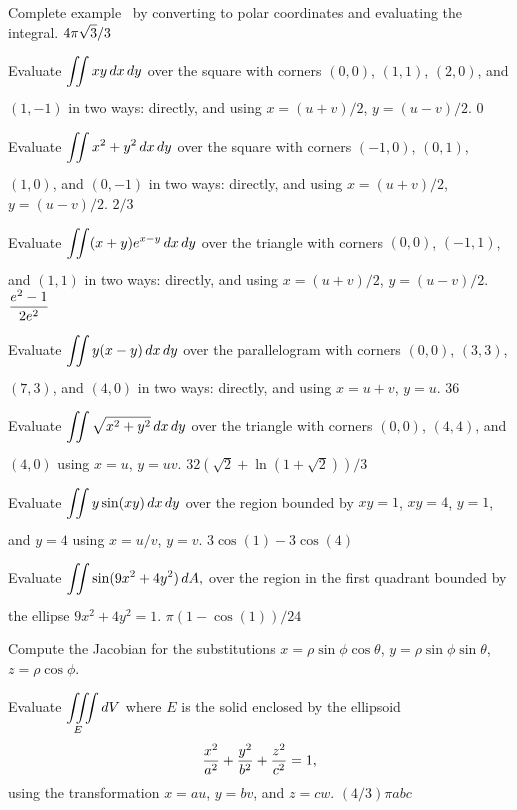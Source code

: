 \exercises

\exercise Complete example~ by
converting to polar coordinates and evaluating the integral.
\answer $\displaystyle 4\pi\sqrt3/3$
\endanswer
\endexercise

\exercise Evaluate $\ds\dint{} xy\,dx\,dy$ over the square
with corners $(0,0)$, $(1,1)$, $(2,0)$, and $(1,-1)$ in two ways:
directly, and using $x=(u+v)/2$, $y=(u-v)/2$.
\answer $0$
\endanswer
\endexercise

\exercise Evaluate $\ds\dint{} x^2+y^2\,dx\,dy$ over the square
with corners $(-1,0)$, $(0,1)$, $(1,0)$, and $(0,-1)$ in two ways:
directly, and using $x=(u+v)/2$, $y=(u-v)/2$.
\answer $2/3$
\endanswer
\endexercise

\exercise Evaluate $\ds\dint{} (x+y)e^{x-y}\,dx\,dy$ over the triangle
with corners $(0,0)$, $(-1,1)$, and $(1,1)$ in two ways:
directly, and using $x=(u+v)/2$, $y=(u-v)/2$.
\answer $\displaystyle {e^2-1\over 2e^2}$
\endanswer
\endexercise

\exercise Evaluate $\ds\dint{} y(x-y)\,dx\,dy$ over the parallelogram
with corners $(0,0)$, $(3,3)$, $(7,3)$, and $(4,0)$ in two ways:
directly, and using $x=u+v$, $y=u$.
\answer $36$
\endanswer
\endexercise

\exercise Evaluate $\ds\dint{} \sqrt{x^2+y^2}\,dx\,dy$ over the
triangle with corners $(0,0)$, $(4,4)$, and $(4,0)$ using $x=u$, $y=uv$.
\answer $32(\sqrt2+\ln(1+\sqrt2))/3$
\endanswer
\endexercise

\exercise Evaluate $\ds\dint{} y\sin(xy)\,dx\,dy$ over the
region bounded by $xy=1$, $xy=4$, $y=1$, and $y=4$ using
$x=u/v$, $y=v$.
\answer $3\cos(1)-3\cos(4)$
\endanswer

\endexercise

\exercise Evaluate $\ds\dint{} \sin(9x^2 + 4y^2)\,dA,$ over the region
 in the first quadrant bounded by the ellipse $9x^2+4y^2 = 1$.
\answer $\pi(1-\cos(1))/24$
\endanswer
\endexercise

\exercise Compute the Jacobian for the substitutions 
$x=\rho\sin\phi\cos\theta$, $y=\rho\sin\phi\sin\theta$, 
$z=\rho\cos\phi$.
\endexercise

\exercise Evaluate $\ds\tint{E}dV$ where $E$ is the solid
enclosed by the ellipsoid
$${x^2\over a^2} + {y^2\over b^2} + {z^2\over c^2} = 1,$$ 
using the transformation $x=au$, $y=bv$, and $z=cw$.
\answer $(4/3)\pi abc$
\endanswer
\endexercise

\endexercises
